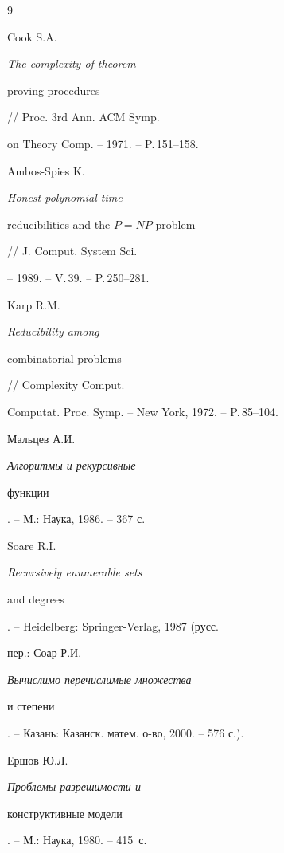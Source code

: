 \begin{thebibliography}{9}







Cook S.A. {\it The complexity of theorem


proving procedures} // Proc. 3rd Ann. ACM Symp.


on Theory Comp. -- 1971. -- P.\,151--158.







Ambos-Spies K. {\it Honest polynomial time


reducibilities and the $P=NP$ problem} // J. Comput. System Sci.


-- 1989. -- V.\,39. -- P.\,250--281.







Karp R.M. {\it Reducibility among


combinatorial problems} // Complexity Comput.


Computat. Proc. Symp. -- New York, 1972. -- P.\,85--104.







Мальцев А.И. {\it Алгоритмы и рекурсивные


функции}. -- М.: Наука, 1986. -- 367 с.







Soare R.I. {\it Recursively enumerable sets


and degrees}. -- Heidelberg: Springer-Verlag, 1987 (русс.


пер.: Соар Р.И. {\it  Вычислимо перечислимые множества


и степени}. -- Казань: Казанск. матем. о-во, 2000. -- 576 с.).







Ершов Ю.Л. {\it Проблемы разрешимости и


конструктивные модели}. -- М.: Наука, 1980. -- 415~с.





\end{thebibliography}





\vskip 2cm












\label{end}





